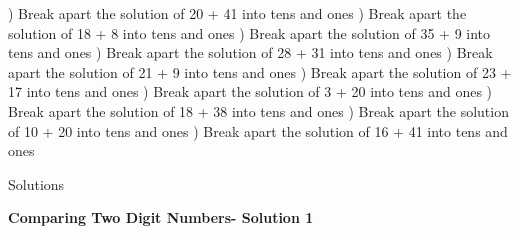 \documentclass{article}%
\begin{document}
) Break apart the solution of 20 + 41 into tens and ones%
\newline%
\newline%
) Break apart the solution of 18 + 8 into tens and ones%
\newline%
\newline%
) Break apart the solution of 35 + 9 into tens and ones%
\newline%
\newline%
) Break apart the solution of 28 + 31 into tens and ones%
\newline%
\newline%
) Break apart the solution of 21 + 9 into tens and ones%
\newline%
\newline%
) Break apart the solution of 23 + 17 into tens and ones%
\newline%
\newline%
) Break apart the solution of 3 + 20 into tens and ones%
\newline%
\newline%
) Break apart the solution of 18 + 38 into tens and ones%
\newline%
\newline%
) Break apart the solution of 10 + 20 into tens and ones%
\newline%
\newline%
) Break apart the solution of 16 + 41 into tens and ones%
\newline%
\newline%
\newline%
\pagebreak%
\huge%
\vspace*{\fill}%
\begin{center}%
Solutions%
\end{center}%
\vspace*{\fill}%
\normalsize%
\pagebreak%
\large%
\begin{center}%
\textbf{Comparing Two Digit Numbers- Solution 1}%
\newline%
\end{center} \normalsize%
\end{document}

